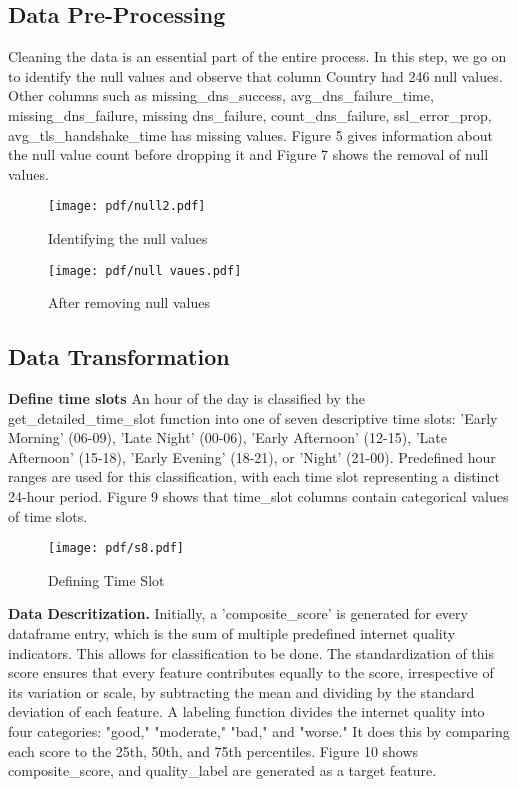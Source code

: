 \subsection {Data  Pre-Processing}
Cleaning the data is an essential part of the entire process. In this step, we go on to identify the null values and observe that column Country had 246 null values. Other columns such as missing\_dns\_success, avg\_dns\_failure\_time, missing\_dns\_failure, missing dns\_failure, count\_dns\_failure, ssl\_error\_prop, avg\_tls\_handshake\_time has missing values. Figure 5 gives information about the null value count before dropping it and Figure 7 shows the removal of null values.
\begin{figure}[ht!]
  \raggedright
  \texttt{[image: pdf/null2.pdf]}
  \vspace{-10pt}
  \caption{Identifying the null values}
\end{figure}
\begin{figure}[ht!]
  \raggedright
  \texttt{[image: pdf/null vaues.pdf]}
  \vspace{-10pt}
  \caption{After removing null values}
\end{figure}
\subsection {Data Transformation}

\textbf{Define time slots}
An hour of the day is classified by the get\_detailed\_time\_slot function into one of seven descriptive time slots: 'Early Morning' (06-09), 'Late Night' (00-06), 'Early Afternoon' (12-15), 'Late Afternoon' (15-18), 'Early Evening' (18-21), or 'Night' (21-00). Predefined hour ranges are used for this classification, with each time slot representing a distinct 24-hour period. Figure 9 shows that time\_slot columns contain categorical values of time slots.
\begin{figure}[ht!]
  \raggedright
  \texttt{[image: pdf/s8.pdf]}
  \vspace{-10pt}
  \caption{Defining Time Slot}
\end{figure}

\textbf{Data Descritization.}
Initially, a 'composite\_score' is generated for every dataframe entry, which is the sum of multiple predefined internet quality indicators. This allows for classification to be done. The standardization of this score ensures that every feature contributes equally to the score, irrespective of its variation or scale, by subtracting the mean and dividing by the standard deviation of each feature. A labeling function divides the internet quality into four categories: "good," "moderate," "bad," and "worse." It does this by comparing each score to the 25th, 50th, and 75th percentiles. Figure 10 shows composite\_score, and quality\_label are generated as a target feature.  


